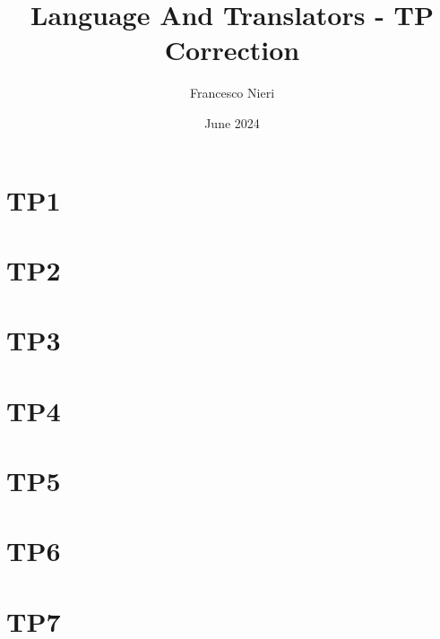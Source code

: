 \documentclass{article}
\title{Language And Translators - TP Correction}
\author{Francesco Nieri}
\date{June 2024}
\begin{document}
\maketitle
\tableofcontents
\newpage
\section{TP1}
    
\newpage
\section{TP2}
    
\newpage
\section{TP3}
    
\newpage
\section{TP4}
    
\newpage
\section{TP5}
    
\newpage
\section{TP6}
    
\newpage
\section{TP7}
    
\end{document}
